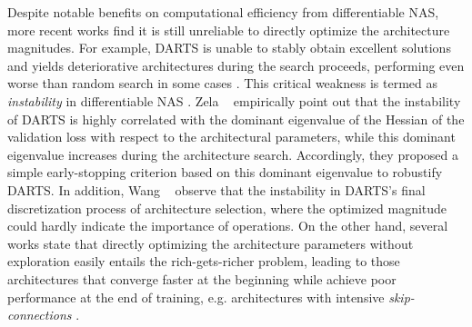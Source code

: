 \documentclass[10pt,twocolumn,letterpaper]{article}
\begin{document}
Despite notable benefits on computational efficiency from differentiable NAS, more recent works find it is still unreliable \cite{zela2019understanding,chen2020stabilizing} to directly optimize the architecture magnitudes. For example, DARTS is unable to stably obtain excellent solutions and yields deteriorative architectures during the search proceeds, performing even worse than random search in some cases \cite{sciuto2019evaluating}. This critical weakness is termed as \textit{instability} in differentiable NAS \cite{zela2019understanding}. Zela \etal~\cite{zela2019understanding} empirically point out that the instability of DARTS is highly correlated with the dominant eigenvalue of the Hessian of the validation loss with respect to the architectural parameters, while this dominant eigenvalue increases during the architecture search. Accordingly, they proposed a simple early-stopping criterion based on this dominant eigenvalue to robustify DARTS. In addition, Wang \etal~\cite{Rethinking2021} observe that the instability in DARTS's final discretization process of architecture selection, where the optimized magnitude could hardly indicate the importance of operations. On the other hand, several works \cite{shu2019understanding,chen2020drnas,li2019improving,zhang2020one} state that directly optimizing the architecture parameters without exploration easily entails the rich-gets-richer problem, leading to those architectures that converge faster at the beginning while achieve poor performance at the end of training, e.g. architectures with intensive \textit{skip-connections} \cite{chu2019fairnas,liang2019darts+}.
\end{document}
